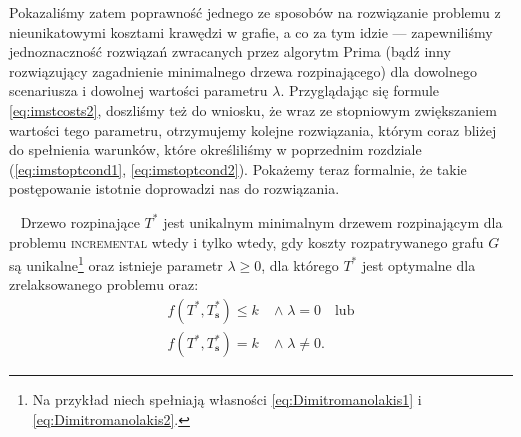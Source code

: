Pokazaliśmy zatem poprawność jednego ze sposobów na rozwiązanie problemu z nieunikatowymi kosztami krawędzi w grafie, a co za tym idzie --- zapewniliśmy jednoznaczność rozwiązań zwracanych przez algorytm Prima (bądź inny rozwiązujący zagadnienie minimalnego drzewa rozpinającego) dla dowolnego scenariusza i dowolnej wartości parametru $\lambda$. Przyglądając się formule \ref{eq:imstcosts2}, doszliśmy też do wniosku, że wraz ze stopniowym zwiększaniem wartości tego parametru, otrzymujemy kolejne rozwiązania, którym coraz bliżej do spełnienia warunków, które określiliśmy w poprzednim rozdziale (\ref{eq:imstoptcond1}, \ref{eq:imstoptcond2}). Pokażemy teraz formalnie, że takie postępowanie istotnie doprowadzi nas do rozwiązania.

\begin{theorem}~\cite[$589$]{incNetOpt}\label{th:incNetOpt}
	Drzewo rozpinające $T^{\ast}$ jest unikalnym minimalnym drzewem rozpinającym dla problemu \textsc{incremental} wtedy i tylko wtedy, gdy koszty rozpatrywanego grafu $G$ są unikalne\footnote{Na przykład niech spełniają własności \ref{eq:Dimitromanolakis1} i \ref{eq:Dimitromanolakis2}.} oraz istnieje parametr $\lambda \geqslant 0$, dla którego $T^{\ast}$ jest optymalne dla zrelaksowanego problemu oraz:
	\begin{align}
		f \left( T^{\ast}, T^{\ast}_{\textbf{s}} \right) \leqslant k \; & \wedge \; \lambda = 0 \quad \text{lub}\label{eq:imstoptcond3}\\
		f \left( T^{\ast}, T^{\ast}_{\textbf{s}} \right) = k \; & \wedge \; \lambda \neq 0\text{.}\label{eq:imstoptcond4}
	\end{align}
\end{theorem}

